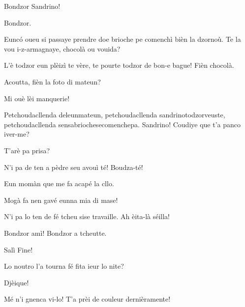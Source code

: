 \begin{drama}

\Saventaspeaks Bondzor Sandrino!

\Sandrinospeaks Bondzor.

\Saventaspeaks Eunc\'o oueu si passaye prendre doe brioche pe comenchì bièn la dzornoù. Te la vou i-z-armagnaye, chocolà ou vouida?

\Sandrinospeaks L'è todzor eun plèizì te vère, te pourte todzor de bon-e bague! Fièn chocolà.


\Saventaspeaks Acoutta, fièn la foto di mateun?

\Sandrinospeaks Mi ouè lèi manquerie!



\Saventaspeaks{} Petchoudacllenda deleunmateun, petchoudacllenda sandrinotodzorveuste, petchoudacllenda sensabriochesecomenchepa.  Sandrino! Coudiye que t'a panco iver-me?

\Sandrinospeaks{} T'arè pa prisa?

\Saventaspeaks N'i pa de ten a pèdre seu avouì té! Boudza-té!

\Sandrinospeaks Eun momàn que me fa acapé la cllo.


\Saventaspeaks{} Mogà fa nen gavé eunna mia di mase!

\Sandrinospeaks N'i pa lo ten de fé tcheu sise travaille. Ah èita-là séilla!


\Saventaspeaks Bondzor amì! Bondzor a tcheutte.

\Tcheuttespeaks Salì Fine!

\Saventaspeaks{} Lo noutro l'a tourna fé fita ieur lo nite?

\Tuenospeaks Djèique!

\Richardspeaks Mé n'i gnenca vi-lo!  T'a prèi de couleur dernièramente!


\end{drama}
